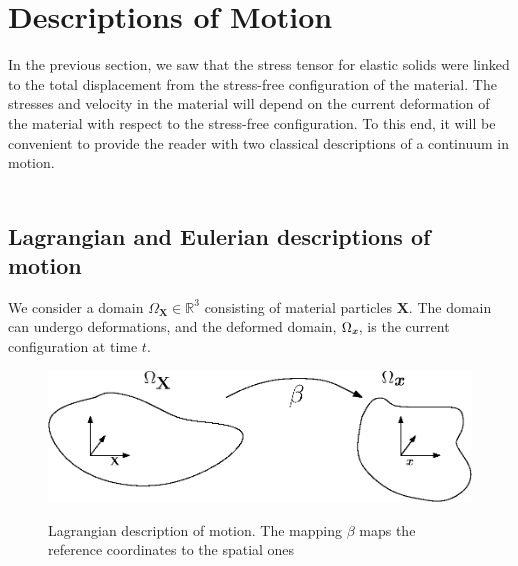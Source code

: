 \section{Descriptions of Motion} \label{sec:DoM}
In the previous section, we saw that the stress tensor for elastic solids were linked to the total displacement from the stress-free configuration of the material. The stresses and velocity in the material will depend on the current deformation of the material with respect to the stress-free configuration. To this end, it will be convenient to provide the reader with two classical descriptions of a continuum in motion. 
\\
\\
\subsection{Lagrangian and Eulerian descriptions of motion}
We consider a domain $\Omega_{\mathbf{X}} \in \mathbb{R}^3$ consisting of material particles $\mathbf{X}$. The domain can undergo deformations, and the deformed domain, $\Omega_{\textit{\textbf{x}}}$, is the current configuration at time $t$. 
\begin{center}
\begin{figure}[!ht]
\includegraphics{figures/Lagrangian_domain} \label{Lagrangian}
\caption{Lagrangian description of motion. The mapping $\beta$ maps the reference coordinates to the spatial ones}
\end{figure}
\end{center}

